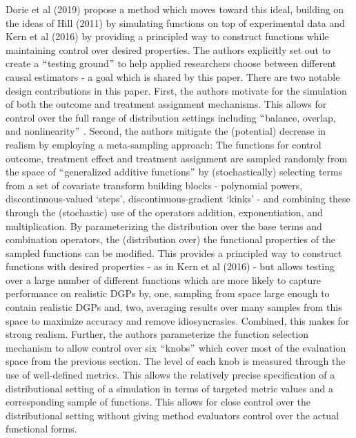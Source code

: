 \documentclass[../main.tex]{subfiles}
\begin{document}
\vspace{\baselineskip}
Dorie et al (2019) propose a method which moves toward this ideal, building on the ideas of Hill (2011) by simulating functions on top of experimental data and Kern et al (2016) by providing a principled way to construct functions while maintaining control over desired properties. The authors explicitly set out to create a $``$testing ground$"$  to help applied researchers choose between different causal estimators - a goal which is shared by this paper. There are two notable design contributions in this paper. First, the authors motivate for the simulation of both the outcome and treatment assignment mechanisms. This allows for control over the full range of distribution settings including $``$balance, overlap, and nonlinearity$"$ . Second, the authors mitigate the (potential) decrease in realism by employing a meta-sampling approach: The functions for control outcome, treatment effect and treatment assignment are sampled randomly from the space of $``$generalized additive functions$"$  by (stochastically) selecting terms from a set of covariate transform building blocks - polynomial powers, discontinuous-valued ‘steps’, discontinuous-gradient ‘kinks’ - and combining these through the (stochastic) use of the operators addition, exponentiation, and multiplication. By parameterizing the distribution over the base terms and combination operators, the (distribution over) the functional properties of the sampled functions can be modified. This provides a principled way to construct functions with desired properties - as in Kern et al (2016) - but allows testing over a large number of different functions which are more likely to capture performance on realistic DGPs by, one, sampling from space large enough to contain realistic DGPs and, two, averaging results over many samples from this space to maximize accuracy and remove idiosyncrasies. Combined, this makes for strong realism. Further, the authors parameterize the function selection mechanism to allow control over six $``$knobs$"$  which cover most of the evaluation space from the previous section. The level of each knob is measured through the use of well-defined metrics. This allows the relatively precise specification of a distributional setting of a simulation in terms of targeted metric values and a corresponding sample of functions. This allows for close control over the distributional setting without giving method evaluators control over the actual functional forms. \par
\end{document}
